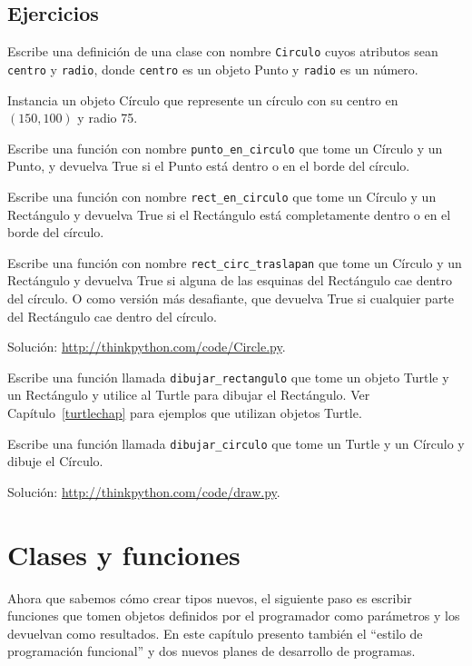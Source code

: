 \documentclass[10pt]{book}
\begin{document}
\section{Ejercicios}

\begin{exercise}

Escribe una definición de una clase con nombre {\tt Circulo} cuyos atributos sean
{\tt centro} y {\tt radio}, donde {\tt centro} es un objeto Punto
y {\tt radio} es un número.

Instancia un objeto Círculo que represente un círculo con su centro
en $(150, 100)$ y radio 75.

Escribe una función con nombre \verb"punto_en_circulo" que tome un Círculo y
un Punto, y devuelva True si el Punto está dentro o en el borde del
círculo.

Escribe una función con nombre \verb"rect_en_circulo" que tome un Círculo y un
Rectángulo y devuelva True si el Rectángulo está completamente dentro o en el borde
del círculo.

Escribe una función con nombre \verb"rect_circ_traslapan" que tome un Círculo
y un Rectángulo y devuelva True si alguna de las esquinas del Rectángulo cae
dentro del círculo.  O como versión más desafiante, que devuelva True si
cualquier parte del Rectángulo cae dentro del círculo.

Solución: \url{http://thinkpython.com/code/Circle.py}.

\end{exercise}


\begin{exercise}

Escribe una función llamada \verb"dibujar_rectangulo" que tome un objeto Turtle
y un Rectángulo y utilice al Turtle para dibujar el Rectángulo.  Ver
Capítulo~\ref{turtlechap} para ejemplos que utilizan objetos Turtle.

Escribe una función llamada \verb"dibujar_circulo" que tome un Turtle y
un Círculo y dibuje el Círculo.

Solución: \url{http://thinkpython.com/code/draw.py}.

\end{exercise}



\chapter{Clases y funciones}
\label{time}

Ahora que sabemos cómo crear tipos nuevos, el siguiente
paso es escribir funciones que tomen objetos definidos por el programador
como parámetros y los devuelvan como resultados.  En este capítulo
presento también el ``estilo de programación funcional'' y dos nuevos
planes de desarrollo de programas.
\end{document}
